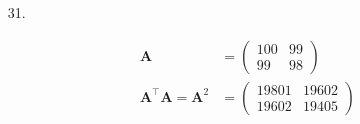 \documentclass{sjtuarticle}
\begin{document}
\begin{itemize}
\begin{proof}
        \begin{equation*}
            \text{cond}(\bm{A})_\infty=\Vert \bm{A}^{-1}\Vert_\infty\Vert \bm{A}\Vert_\infty=\left(\left|\frac{1}{\lambda}\right|+2\right)\cdot \max\{|3\lambda|, 2\}=\begin{cases}
                \left(\left|\frac{1}{\lambda}\right|+2\right)\cdot |3\lambda|=3+6|\lambda|,& |\lambda|\geq \frac{2}{3},\\
                2\left(\left|\frac{1}{\lambda}\right|+2\right),& |\lambda|<\frac{2}{3}
            \end{cases}
        \end{equation*}
        三个分段分别单调，均在边界处取得最小值，即在 $\lambda=\pm \frac{2}{3}$ 处取得最小值 $7$。
    \end{proof}
    \item[31.]\begin{solution}
        \begin{align*}
            \bm{A}&=\begin{pmatrix}
                100 & 99 \\
                99 & 98
            \end{pmatrix}\\
            \bm{A}^\top\bm{A}=\bm{A}^2&=\begin{pmatrix}
                19801 & 19602 \\
                19602 & 19405
            \end{pmatrix}\\

\end{align*}
\end{solution}
\end{itemize}
\end{document}
